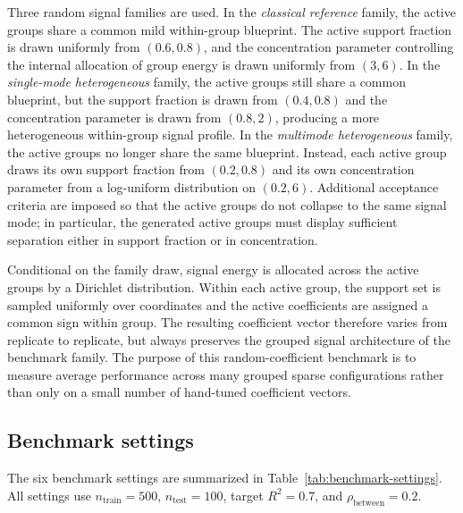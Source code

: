 \documentclass[11pt]{article}
\begin{document}
Three random signal families are used. In the \emph{classical reference}
family, the active groups share a common mild within-group blueprint. The
active support fraction is drawn uniformly from \((0.6,0.8)\), and the
concentration parameter controlling the internal allocation of group energy is
drawn uniformly from \((3,6)\). In the \emph{single-mode heterogeneous}
family, the active groups still share a common blueprint, but the support
fraction is drawn from \((0.4,0.8)\) and the concentration parameter is drawn
from \((0.8,2)\), producing a more heterogeneous within-group signal profile.
In the \emph{multimode heterogeneous} family, the active groups no longer share
the same blueprint. Instead, each active group draws its own support fraction
from \((0.2,0.8)\) and its own concentration parameter from a log-uniform
distribution on \((0.2,6)\). Additional acceptance criteria are imposed so
that the active groups do not collapse to the same signal mode; in particular,
the generated active groups must display sufficient separation either in
support fraction or in concentration.

Conditional on the family draw, signal energy is allocated across the active
groups by a Dirichlet distribution. Within each active group, the support set is
sampled uniformly over coordinates and the active coefficients are assigned a
common sign within group. The resulting coefficient vector therefore varies from
replicate to replicate, but always preserves the grouped signal architecture of
the benchmark family. The purpose of this random-coefficient benchmark is to
measure average performance across many grouped sparse configurations rather
than only on a small number of hand-tuned coefficient vectors.

\subsection{Benchmark settings}

The six benchmark settings are summarized in
Table~\ref{tab:benchmark-settings}. All settings use
\(n_{\mathrm{train}}=500\), \(n_{\mathrm{test}}=100\), target \(R^2=0.7\), and
\(\rho_{\mathrm{between}}=0.2\).
\end{document}
